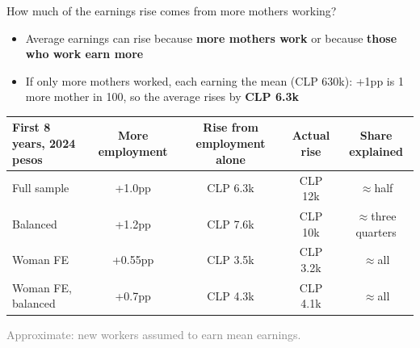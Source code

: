 \documentclass[aspectratio=169,10pt]{beamer}
\newcommand{\fuente}[1]{\vspace{2pt}\textcolor{graytext}{\scriptsize #1}}
\newcommand{\takeaway}[1]{\par\vspace{6pt}{\small\textcolor{steel}{$\Rightarrow$}\ \textbf{\textcolor{navy}{#1}}}}
\begin{document}
\begin{frame}{How much of the earnings rise comes from more mothers working?}
\begin{itemize}
  \footnotesize
  \item Average earnings can rise because \textbf{more mothers work} or because \textbf{those who work earn more}
  \item If only more mothers worked, each earning the mean (CLP 630k): +1pp is 1 more mother in 100, so the average rises by \textbf{CLP 6.3k}
\end{itemize}
\vspace{4pt}
\begin{center}
\scriptsize
\setlength{\tabcolsep}{6pt}
\begin{tabular}{@{}lcccc@{}}
\toprule
First 8 years, 2024 pesos & More employment & Rise from employment alone & Actual rise & Share explained \\
\midrule
Full sample & +1.0pp & CLP 6.3k & CLP 12k & $\approx$half \\
Balanced & +1.2pp & CLP 7.6k & CLP 10k & $\approx$three quarters \\
Woman FE & +0.55pp & CLP 3.5k & CLP 3.2k & $\approx$all \\
Woman FE, balanced & +0.7pp & CLP 4.3k & CLP 4.1k & $\approx$all \\
\bottomrule
\end{tabular}
\end{center}
\takeaway{More mothers working explains about half of the rise in the UV, and about all of it with woman fixed effects. The rest in the UV would come from mothers already working or from who lives there.}
\par\fuente{Approximate: new workers assumed to earn mean earnings.}
\end{frame}
\end{document}

